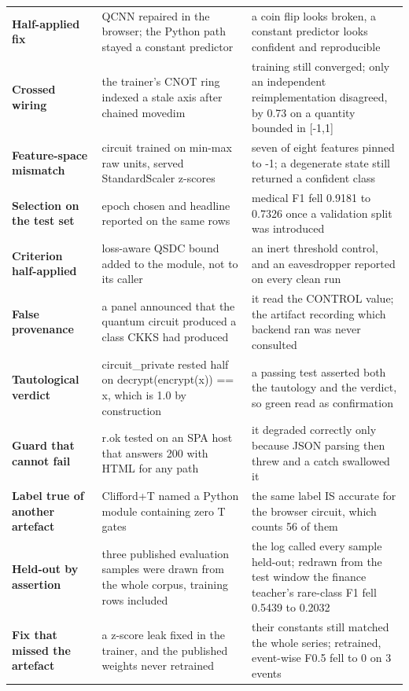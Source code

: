 {\begin{longtable}{>{\raggedright\arraybackslash}p{2.5cm}>{\raggedright\arraybackslash}p{5.2cm}>{\raggedright\arraybackslash}p{6.2cm}}
\textbf{Half-applied fix} & QCNN repaired in the browser; the Python path stayed a constant predictor & a coin flip looks broken, a constant predictor looks confident and reproducible \\
\textbf{Crossed wiring} & the trainer's CNOT ring indexed a stale axis after chained movedim & training still converged; only an independent reimplementation disagreed, by 0.73 on a quantity bounded in [-1,1] \\
\textbf{Feature-space mismatch} & circuit trained on min-max raw units, served StandardScaler z-scores & seven of eight features pinned to -1; a degenerate state still returned a confident class \\
\textbf{Selection on the test set} & epoch chosen and headline reported on the same rows & medical F1 fell 0.9181 to 0.7326 once a validation split was introduced \\
\textbf{Criterion half-applied} & loss-aware QSDC bound added to the module, not to its caller & an inert threshold control, and an eavesdropper reported on every clean run \\
\textbf{False provenance} & a panel announced that the quantum circuit produced a class CKKS had produced & it read the CONTROL value; the artifact recording which backend ran was never consulted \\
\textbf{Tautological verdict} & circuit\_private rested half on decrypt(encrypt(x)) == x, which is 1.0 by construction & a passing test asserted both the tautology and the verdict, so green read as confirmation \\
\textbf{Guard that cannot fail} & r.ok tested on an SPA host that answers 200 with HTML for any path & it degraded correctly only because JSON parsing then threw and a catch swallowed it \\
\textbf{Label true of another artefact} & Clifford+T named a Python module containing zero T gates & the same label IS accurate for the browser circuit, which counts 56 of them \\
\textbf{Held-out by assertion} & three published evaluation samples were drawn from the whole corpus, training rows included & the log called every sample held-out; redrawn from the test window the finance teacher's rare-class F1 fell 0.5439 to 0.2032 \\
\textbf{Fix that missed the artefact} & a z-score leak fixed in the trainer, and the published weights never retrained & their constants still matched the whole series; retrained, event-wise F0.5 fell to 0 on 3 events \\
\bottomrule
\end{longtable}}

